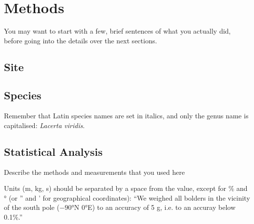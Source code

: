 \chapter{Methods}
\label{ch:methods}
You may want to start with a few, brief sentences of what you actually did, before going into the details over the next sections.

\section{Site}
\section{Species}
 Remember that Latin species names are set in italics, and only the genus name is capitalised: \emph{Lacerta viridis}.
\section{Statistical Analysis}

  Describe the methods and measurements that you used here

  Units (m, kg, s) should be separated by a space from the value, except for \% and ° (or '' and ' for geographical coordinates): ``We weighed all bolders in the vicinity of the south pole ($-90$°N 0°E) to an accuracy of 5 g, i.e. to an accuray below 0.1\%.''
